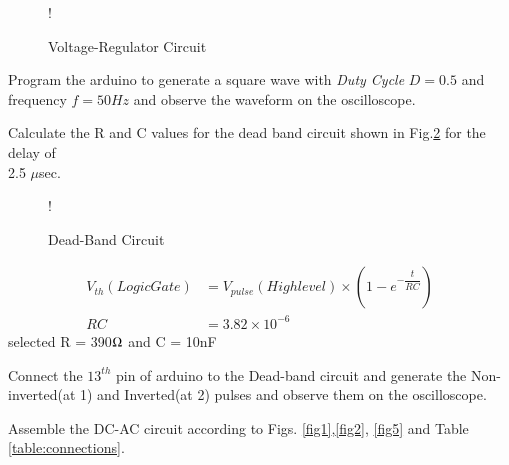 \documentclass[journal,12pt,twocolumn]{IEEEtran}
\begin{document}
\begin{figure}[!ht]
\centering
\resizebox {\columnwidth} {!} {

}
\caption{Voltage-Regulator Circuit} 
\label{fig3}
\end{figure}
\begin{problem}
Program the arduino to generate a square wave with {\em Duty Cycle} $D=0.5$ and frequency $f=50 Hz$ and observe the waveform on the oscilloscope. 
\end{problem}
\solution
 
\begin{problem}
Calculate the R and C values for the dead band circuit shown in Fig.\ref{fig4} for the delay of \\ 2.5 $\mu$sec.
\end{problem}
\begin{figure}[!h]
\centering
\resizebox {\columnwidth} {!} {

}
\caption{Dead-Band Circuit} 
\label{fig4}
\end{figure}
\solution
\begin{align*}
V_{th}(Logic Gate) &= V_{pulse}(High level) \times (1-e^{-\dfrac{t}{RC}})\\
RC &= 3.82 \times 10^{-6}
\end{align*}
selected  R = 390$\ohm$ and C = 10nF 
\begin{problem}
Connect the $13^{th}$ pin of arduino to the Dead-band circuit and generate the Non-inverted(at 1) and Inverted(at 2) pulses and observe them on the oscilloscope.
\end{problem}
\begin{problem}
Assemble the DC-AC circuit according to Figs. \ref{fig1},\ref{fig2}, \ref{fig5} and Table \ref{table:connections}.
\end{problem}
\end{document}
